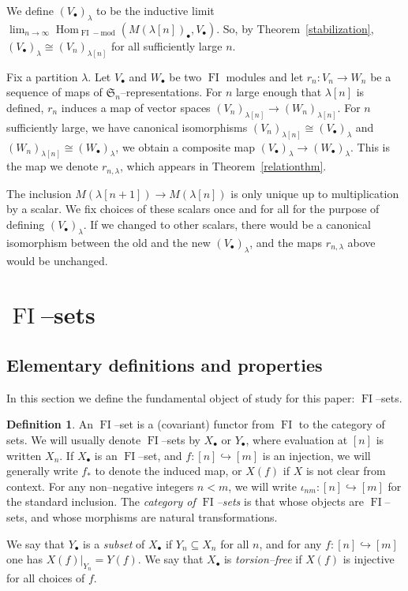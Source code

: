 \documentclass[10pt]{amsart}
\DeclareMathOperator{\FI}{FI}
\DeclareMathOperator{\Hom}{Hom}
\newcommand{\Sn}{\mathfrak{S}}
\newcommand{\dt}{\bullet}
\theoremstyle{definition}
\newtheorem{definition}[theorem]{Definition}
\begin{document}
We define $(V_{\dt})_{\lambda}$ to be the inductive limit $\lim_{n \to \infty} \Hom_{\FI-\text{mod}}(M(\lambda[n])_\dt, V_\dt)$.
So, by Theorem~\ref{stabilization}, $(V_{\dt})_{\lambda} \cong (V_n)_{\lambda[n]}$ for all sufficiently large $n$. 

Fix a partition $\lambda$.
Let $V_{\dt}$ and $W_{\dt}$ be two $\FI$ modules and let $r_n: V_n \to W_n$ be a sequence of maps of $\Sn_n$--representations.
For $n$ large enough that $\lambda[n]$ is defined, $r_n$ induces a map of vector spaces $(V_{n})_{\lambda[n]} \to (W_{n})_{\lambda[n]}$.
For $n$ sufficiently large, we have canonical isomorphisms $(V_{n})_{\lambda[n]} \cong (V_{\dt})_{\lambda}$ and $(W_{n})_{\lambda[n]} \cong (W_{\dt})_{\lambda}$, we obtain a composite map $(V_{\dt})_{\lambda} \to (W_{\dt})_{\lambda}$. This is the map we denote $r_{n, \lambda}$, which appears in Theorem~\ref{relationthm}.

The inclusion $M(\lambda[n+1]) \to M(\lambda[n])$ is only unique up to multiplication by a scalar. We fix choices of these scalars once and for all for the purpose of defining $(V_{\dt})_{\lambda}$. If we changed to other scalars, there would be a canonical isomorphism between the old and the new $(V_{\dt})_{\lambda}$, and the maps $r_{n, \lambda}$ above would be unchanged.

\section{\texorpdfstring{$\FI$}{FI}--sets}

\subsection{Elementary definitions and properties}

In this section we define the fundamental object of study for this paper: $\FI$--sets.

\begin{definition}
An $\FI$--set is a (covariant) functor from $\FI$ to the category of sets. We will usually denote $\FI$--sets by $X_\dt$ or $Y_\dt$, where evaluation at $[n]$ is written $X_n$. If $X_\dt$ is an $\FI$--set, and $f:[n] \hookrightarrow [m]$ is an injection, we will generally write $f_{\ast}$ to denote the induced map, or $X(f)$ if $X$ is not clear from context. For any non--negative integers $n < m$, we will write $\iota_{nm}:[n] \hookrightarrow [m]$ for the standard inclusion. The \emph{category of $\FI$--sets} is that whose objects are $\FI$--sets, and whose morphisms are natural transformations.

We say that $Y_\dt$ is a \emph{subset} of $X_\dt$ if $Y_n \subseteq X_n$ for all $n$, and for any $f:[n] \hookrightarrow [m]$ one has $X(f)|_{Y_n} = Y(f)$. We say that $X_\dt$ is \emph{torsion--free} if $X(f)$ is injective for all choices of $f$.
\end{definition}
\end{document}
